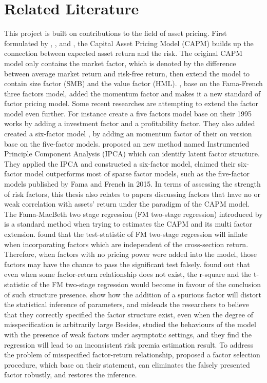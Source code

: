	\chapter{Related Literature}\label{Literature}
This project is built on contributions to the field of asset pricing.
First formulated by , , and , the Capital Asset Pricing Model (CAPM) builds up the connection between expected asset return and the risk.
The original CAPM model only contains the market factor, which is denoted by the difference between average market return and risk-free return, then extend the model to contain size factor (SMB) and the value factor (HML).
, base on the Fama-French three factors model, added the momentum factor and makes it a new standard of factor pricing model.
Some recent researches are attempting to extend the factor model even further.
For instance  create a five factors model base on their 1995 works by adding a investment factor and a profitability factor.
They also added created a six-factor model \cite{Fama2018}, by adding an momentum factor of their on version base on the five-factor models.
 proposed an new method named Instrumented Principle Component Analysis (IPCA) which can identify latent factor structure.
They applied the IPCA and constructed a six-factor model, claimed their six-factor model outperforms most of sparse factor models, such as the five-factor models published by Fama and French in 2015.
In terms of assessing the strength of risk factors, this thesis also relates to papers discussing factors that have no or weak correlation with assets' return under the paradigm of the CAPM model.
The Fama-MacBeth two stage regression (FM two-stage regression) introduced by  is a standard method when trying to estimates the CAPM and its multi factor extension. 
 found that the test-statistic of FM two-stage regression will inflate when incorporating factors which are independent of the cross-section return.
Therefore, when factors with no pricing power were added into the model, those factors may have the chance to pass the significant test falsely.
 found out that even when some factor-return relationship does not exist, the r-square and the t-statistic of the FM two-stage regression would become in favour of the conclusion of such structure presence. 
 show how the addition of a spurious factor will distort the statistical inference of parameters, and misleads the researchers to believe that they correctly specified the factor structure exist, even when the degree of misspecification is arbitrarily large
Besides,  studied the behaviours of the model with the presence of weak factors under asymptotic settings, and they find the regression will lead to an inconsistent risk premia estimation result.
To address the problem of misspecified factor-return relationship,  proposed a factor selection procedure, which base on their statement, can eliminates the falsely presented factor robustly, and restores the inference. 
	
